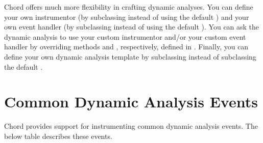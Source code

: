 Chord offers much more flexibility in crafting dynamic analyses.
You can define your own instrumentor (by subclassing 
instead of using the default ) and your own event handler (by subclassing 
instead of using the default ).
You can ask the dynamic analysis to use your custom instrumentor and/or your custom event handler by overriding
methods  and , respectively, defined in .
Finally, you can define your own dynamic analysis template by subclassing 
instead of subclassing the default .

\section{Common Dynamic Analysis Events}
\label{sec:instr-events}

Chord provides support for instrumenting common dynamic analysis events.
The below table describes these events.

